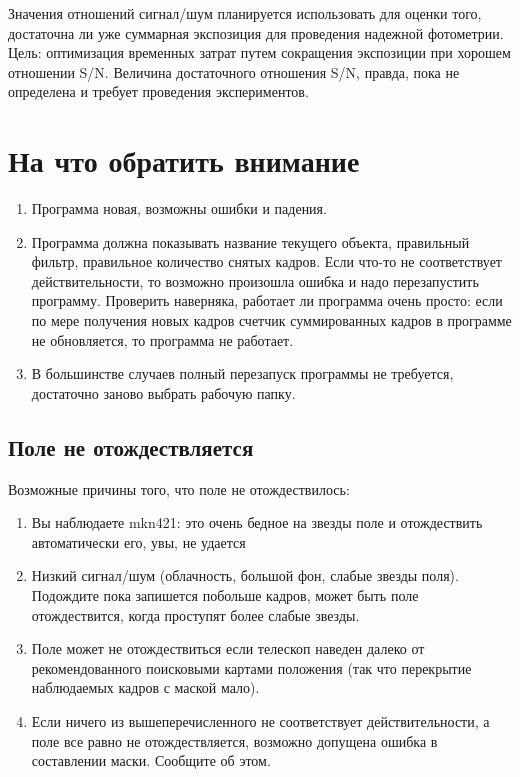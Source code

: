 \documentclass[a4paper,12pt,leqno,notitlepage]{article}
\begin{document}
Значения отношений сигнал/шум планируется использовать для оценки того, достаточна ли уже суммарная экспозиция
для проведения надежной фотометрии. Цель: оптимизация временных затрат путем сокращения экспозиции при
хорошем отношении S/N. Величина достаточного отношения S/N, правда, пока не определена и требует
проведения экспериментов.

\section{На что обратить внимание}
\begin{enumerate}
\item Программа новая, возможны ошибки и падения.
\item Программа должна показывать название текущего объекта, правильный фильтр, правильное количество
снятых кадров. Если что-то не соответствует действительности, то возможно произошла ошибка и надо перезапустить
программу. Проверить наверняка, работает ли программа очень просто: если по мере получения новых кадров счетчик
суммированных кадров в программе не обновляется, то программа не работает.
\item В большинстве случаев полный перезапуск программы не требуется, достаточно заново выбрать рабочую папку.
\end{enumerate}

\subsection{Поле не отождествляется}
Возможные причины того, что поле не отождествилось:
\begin{enumerate}
\item Вы наблюдаете mkn421: это очень бедное на звезды поле и отождествить автоматически его, увы, не удается
\item Низкий сигнал/шум (облачность, большой фон, слабые звезды поля). Подождите пока запишется побольше кадров,
 может быть поле отождествится, когда проступят более слабые звезды.
\item Поле может не отождествиться если телескоп наведен далеко от рекомендованного поисковыми картами положения
  (так что перекрытие наблюдаемых кадров с маской мало).
\item Если ничего из вышеперечисленного не соответствует действительности, а поле все равно не отождествляется,
возможно допущена ошибка в составлении маски. Сообщите об этом.
\end{enumerate}
\end{document}
